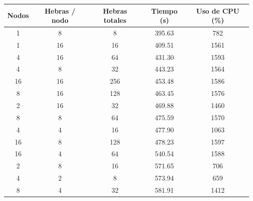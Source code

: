\begin{table}[ht]
    \centering
    \begin{tabular}{c c c c c}
        \hline
        \textbf{Nodos} & \textbf{Hebras / nodo} & \textbf{Hebras totales} & \textbf{Tiempo (s)} & \textbf{Uso de CPU (\%)} \\
        \hline
        1              & 8                      & 8                       & 395.63              & 782                      \\
        1              & 16                     & 16                      & 409.51              & 1561                     \\
        4              & 16                     & 64                      & 431.30              & 1593                     \\
        4              & 8                      & 32                      & 443.23              & 1564                     \\
        16             & 16                     & 256                     & 453.48              & 1586                     \\
        8              & 16                     & 128                     & 463.45              & 1576                     \\
        2              & 16                     & 32                      & 469.88              & 1460                     \\
        8              & 8                      & 64                      & 475.59              & 1570                     \\
        4              & 4                      & 16                      & 477.90              & 1063                     \\
        16             & 8                      & 128                     & 478.23              & 1597                     \\
        16             & 4                      & 64                      & 540.54              & 1588                     \\
        2              & 8                      & 16                      & 571.65              & 706                      \\
        4              & 2                      & 8                       & 573.94              & 659                      \\
        8              & 4                      & 32                      & 581.91              & 1412                     \\

\end{tabular}
\end{table}
